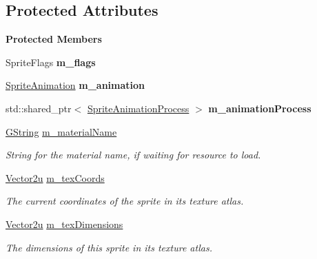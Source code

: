 \subsection*{Protected Attributes}
\begin{Indent}\textbf{ Protected Members}\par
\begin{DoxyCompactItemize}
\item 
\mbox{\label{classrev_1_1_sprite_a4a0441daea9d7c8e1528d66a1a95687f}} 
Sprite\+Flags {\bfseries m\+\_\+flags}
\item 
\mbox{\label{classrev_1_1_sprite_a26c075897574adf84709887c62b8d5f8}} 
\mbox{\hyperlink{classrev_1_1_sprite_animation}{Sprite\+Animation}} {\bfseries m\+\_\+animation}
\item 
\mbox{\label{classrev_1_1_sprite_a9f111a4c75796f8924b027a379178a62}} 
std\+::shared\+\_\+ptr$<$ \mbox{\hyperlink{classrev_1_1_sprite_animation_process}{Sprite\+Animation\+Process}} $>$ {\bfseries m\+\_\+animation\+Process}
\item 
\mbox{\label{classrev_1_1_sprite_a36813ef14ebcebceb6fa4a20542b10b6}} 
\mbox{\hyperlink{classrev_1_1_g_string}{G\+String}} \mbox{\hyperlink{classrev_1_1_sprite_a36813ef14ebcebceb6fa4a20542b10b6}{m\+\_\+material\+Name}}
\begin{DoxyCompactList}\small\item\em String for the material name, if waiting for resource to load. \end{DoxyCompactList}\item 
\mbox{\label{classrev_1_1_sprite_ab1f4b01fea79917db66bb60788092f31}} 
\mbox{\hyperlink{classrev_1_1_vector}{Vector2u}} \mbox{\hyperlink{classrev_1_1_sprite_ab1f4b01fea79917db66bb60788092f31}{m\+\_\+tex\+Coords}}
\begin{DoxyCompactList}\small\item\em The current coordinates of the sprite in its texture atlas. \end{DoxyCompactList}\item 
\mbox{\label{classrev_1_1_sprite_adcfa736d8828c6b75e445313768915bd}} 
\mbox{\hyperlink{classrev_1_1_vector}{Vector2u}} \mbox{\hyperlink{classrev_1_1_sprite_adcfa736d8828c6b75e445313768915bd}{m\+\_\+tex\+Dimensions}}
\begin{DoxyCompactList}\small\item\em The dimensions of this sprite in its texture atlas. \end{DoxyCompactList}\end{DoxyCompactItemize}
\end{Indent}
